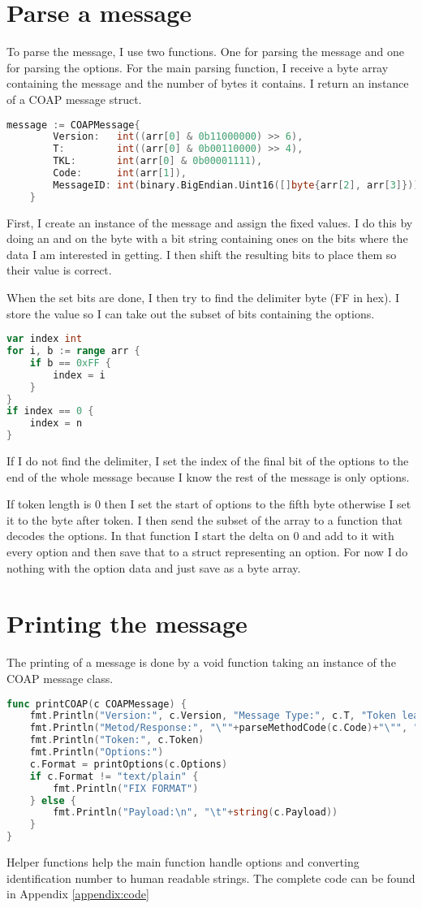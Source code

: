 \documentclass{article}
\begin{document}
\section{Parse a message}
To parse the message, I use two functions. One for parsing the message and one for parsing the options.
For the main parsing function, I receive a byte array containing the message and the number of
bytes it contains. I return an instance of a COAP message struct.
\begin{lstlisting}[language=go]
	message := COAPMessage{
		Version:   int((arr[0] & 0b11000000) >> 6),
		T:         int((arr[0] & 0b00110000) >> 4),
		TKL:       int(arr[0] & 0b00001111),
		Code:      int(arr[1]),
		MessageID: int(binary.BigEndian.Uint16([]byte{arr[2], arr[3]})),
	}
\end{lstlisting}
First, I create an instance of the message and assign the fixed values. I do this
by doing an and on the byte with a bit string containing ones on the bits
where the data I am interested in getting. I then shift the resulting bits to place
them so their value is correct.

When the set bits are done, I then try to find the delimiter byte (FF in hex).
I store the value so I can take out the subset of bits containing the options.
\begin{lstlisting}[language=go]
var index int
for i, b := range arr {
	if b == 0xFF {
		index = i
	}
}
if index == 0 {
	index = n
}
 \end{lstlisting}
 If I do not find the delimiter, I set the index of the final bit of the options to
 the end of the whole message because I know the rest of the message is only options.

 If token length is 0 then I set the start of options to the fifth byte otherwise
 I set it to the byte after token. I then send the subset of the array to a function
 that decodes the options. In that function I start the delta on 0 and add to it with
 every option and then save that to a struct representing an option. For now
 I do nothing with the option data and just save as a byte array. 
 \section{Printing the message}
 The printing of a message is done by a void function taking an instance of the COAP
 message class. 
\begin{lstlisting}[language=go]
func printCOAP(c COAPMessage) {
	fmt.Println("Version:", c.Version, "Message Type:", c.T, "Token leangth:", c.TKL)
	fmt.Println("Metod/Response:", "\""+parseMethodCode(c.Code)+"\"", "Message id:", c.MessageID)
	fmt.Println("Token:", c.Token)
	fmt.Println("Options:")
	c.Format = printOptions(c.Options)
	if c.Format != "text/plain" {
		fmt.Println("FIX FORMAT")
	} else {
		fmt.Println("Payload:\n", "\t"+string(c.Payload))
	}
}
\end{lstlisting}
Helper functions help the main function handle options and converting identification
number to human readable strings. The complete code can be found in Appendix \ref{appendix:code}
 
\end{document}
